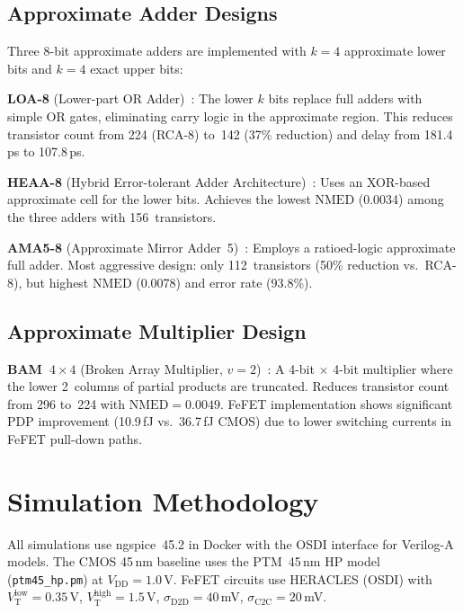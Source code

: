 \documentclass[letterpaper, 10 pt, conference]{ieeeconf}  %
\newcommand{\VT}{V_{\mathrm{T}}}
\newcommand{\NMED}{\mathrm{NMED}}
\newcommand{\sigDD}{\sigma_{\mathrm{D2D}}}
\newcommand{\VDD}{V_{\mathrm{DD}}}
\begin{document}
\subsection{Approximate Adder Designs}

Three 8-bit approximate adders are implemented with $k = 4$ approximate lower
bits and $k = 4$ exact upper bits:

\textbf{LOA-8} (Lower-part OR Adder)~\cite{gupta2013loa}: The lower $k$ bits
replace full adders with simple OR gates, eliminating carry logic in the
approximate region. This reduces transistor count from 224 (RCA-8) to~142
(37\% reduction) and delay from 181.4\,ps to 107.8\,ps.

\textbf{HEAA-8} (Hybrid Error-tolerant Adder Architecture)~\cite{ye2013heaa}:
Uses an XOR-based approximate cell for the lower bits. Achieves the lowest
$\NMED$ (0.0034) among the three adders with 156~transistors.

\textbf{AMA5-8} (Approximate Mirror Adder~5)~\cite{almurib2018ama5}: Employs
a ratioed-logic approximate full adder. Most aggressive design: only
112~transistors (50\% reduction vs.\ RCA-8), but highest $\NMED$ (0.0078) and
error rate (93.8\%).

\subsection{Approximate Multiplier Design}

\textbf{BAM~$4\times4$} (Broken Array Multiplier, $v = 2$)~\cite{momeni2015bam}:
A 4-bit$\,\times\,$4-bit multiplier where the lower 2~columns of partial
products are truncated. Reduces transistor count from 296 to~224 with
$\NMED = 0.0049$. FeFET implementation shows significant PDP improvement
(10.9\,fJ vs.\ 36.7\,fJ CMOS) due to lower switching currents in FeFET
pull-down paths.


\section{Simulation Methodology}

All simulations use ngspice~45.2 in Docker with the OSDI interface for
Verilog-A models. The CMOS 45\,nm baseline uses the PTM~45\,nm HP model
(\texttt{ptm45\_hp.pm}) at $\VDD = 1.0$\,V. FeFET circuits use HERACLES
(OSDI) with $\VT^{\mathrm{low}} = 0.35$\,V, $\VT^{\mathrm{high}} = 1.5$\,V,
$\sigDD = 40$\,mV, $\sigma_{\mathrm{C2C}} = 20$\,mV.
\end{document}
